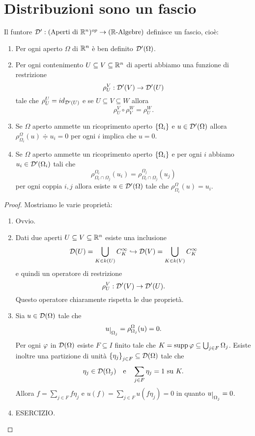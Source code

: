 \section{Distribuzioni sono un fascio}
\begin{proposition}
Il funtore $\mathcal{D}':(\text{Aperti di }\mathbb{R}^n)^{op}\to (\mathbb{R}\text{-Algebre})$ definisce un fascio, cio\`e:
\begin{enumerate}
    \item Per ogni aperto $\Omega$ di $\mathbb{R}^n$ \`e ben definito $\mathcal{D}'(\Omega)$.
    \item Per ogni contenimento $U\subseteq V\subseteq \mathbb{R}^n$ di aperti abbiamo una funzione di restrizione
    \[\rho^V_U:\mathcal{D}'(V)\to\mathcal{D}'(U)\]
    tale che $\rho^U_U=id_{\mathcal{D}'(U)}$ e se $U\subseteq V\subseteq W$ allora 
    \[\rho^V_U\circ\rho^W_V=\rho^W_U.\]
    \item Se $\Omega$ aperto ammette un ricoprimento aperto $\left\{{\Omega_i}\right\}$ e $u\in \mathcal{D}'(\Omega)$ allora $\rho^\Omega_{\Omega_i}(u)\doteqdot u_i=0$ per ogni $i$ implica che $u=0$.
    \item Se $\Omega$ aperto ammette un ricoprimento aperto $\left\{{\Omega_i}\right\}$ e per ogni $i$ abbiamo $u_i\in \mathcal{D}'(\Omega_i)$ tali che 
    \[\rho^{\Omega_i}_{\Omega_{i}\cap \Omega_j}(u_i)=\rho^{\Omega_j}_{\Omega_{i}\cap \Omega_j}(u_j)\]
    per ogni coppia $i,j$ allora esiste $u\in \mathcal{D}'(\Omega)$ tale che $\rho^\Omega_{\Omega_i}(u)= u_i$.
\end{enumerate}
\end{proposition}
\begin{proof}
Mostriamo le varie propriet\`a:
\begin{enumerate}
    \item Ovvio.
    \item Dati due aperti $U\subseteq V\subseteq \mathbb{R}^n$ esiste una inclusione
    \[\mathcal{D}(U)=\bigcup_{K\in k(U)}C^\infty_K\hookrightarrow \mathcal{D}(V)=\bigcup_{K\in k(V)}C^\infty_K\]
    e quindi un operatore di restrizione
    \[\rho^V_U:\mathcal{D}'(V)\to \mathcal{D}'(U).\]
    Questo operatore chiaramente rispetta le due propriet\`a.
    \item Sia $u\in \mathcal{D}(\Omega)$ tale che
\[u\res{\Omega_j}=\rho^\Omega_{\Omega_j}(u)=0.\]
Per ogni $\varphi$ in $\mathcal{D}(\Omega)$ esiste $F\subseteq I$ finito tale che $K=\operatorname{supp} \varphi\subseteq \bigcup_{j\in F}\Omega_j$. Esiste inoltre una partizione di unit\`a $\left\{{\eta_j}\right\}_{j\in F}\subseteq \mathcal{D}(\Omega)$ tale che
\[\eta_j\in \mathcal{D}(\Omega_j)\quad\text e\quad \sum_{j\in F}\eta_j=1\text{ su }K.\]
Allora $f=\sum_{j\in F} f\eta_j$ e $u(f)=\sum_{j\in F}u(f\eta_j)=0$ in quanto $u\res{\Omega_j}=0$.
\item ESERCIZIO.
\end{enumerate}
\end{proof}








